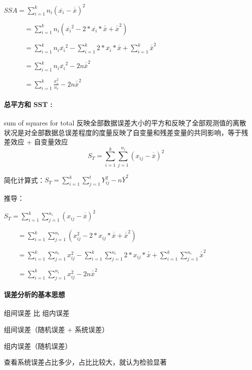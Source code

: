 \documentclass[UTF8,10pt]{book}
\begin{document}
    $ SSA = \sum_{i=1}^k n_i \left(\overline{x_i} - \overline{\overline{x}} \right)^2 $ 
    
    $\quad \quad \quad = \sum_{i=1}^k n_i \left( \overline{x_i}^2 -2*\overline{x_i} * \overline{\overline{x}} + \overline{\overline{x}}^2 \right) $ 
    
    $\quad \quad \quad = \sum_{i=1}^k n_i \overline{x_i}^2 - \sum_{i=1}^k 2*\overline{x_i} * \overline{\overline{x}} +\sum_{i=1}^k \overline{\overline{x}}^2$ 
    
    $\quad \quad \quad = \sum_{i=1}^k n_i \overline{x_i}^2 - 2n\overline{\overline{x}}^2$ 
    
    $\quad \quad \quad = \sum_{i=1}^k \frac{ x_i^2}{n_i} - 2n\overline{\overline{x}}^2 $

    \paragraph{总平方和 SST :} sum of squares for total	反映全部数据误差大小的平方和反映了全部观测值的离散状况是对全部数据总误差程度的度量反映了自变量和残差变量的共同影响，等于残差效应 + 自变量效应$$ S_T = \sum_{i=1}^k \sum_{j=1}^{n_i} \left(x_{ij} - \overline{\overline{x}} \right)^2 $$ 
    
    简化计算式：$ S_T = \sum_{i=1}^k \sum_{j=1}^{t} Y_{ij}^2 - n \overline{Y}^2 $ 
    
    推导： 
    
    $ S_T = \sum_{i=1}^k \sum_{j=1}^{n_i} \left(x_{ij} - \overline{\overline{x}} \right)^2 $ 
    
    $ \quad \quad = \sum_{i=1}^k \sum_{j=1}^{n_i} \left( x_{ij}^2 - 2*x_{ij}* \overline{\overline{x}} + \overline{\overline{x}}^2 \right)$ 
    
    $ \quad \quad = \sum_{i=1}^k \sum_{j=1}^{n_i} x_{ij}^2 -\sum_{i=1}^k \sum_{j=1}^{n_i} 2*x_{ij}* \overline{\overline{x}} + \sum_{i=1}^k \sum_{j=1}^{n_i} \overline{\overline{x}}^2 $ 
    
    $ \quad \quad = \sum_{i=1}^k \sum_{j=1}^{n_i} x_{ij}^2 - 2n\overline{\overline{x}}^2$

    \paragraph{误差分析的基本思想}	组间误差 比 组内误差 
    
    组间误差（随机误差 + 系统误差）
    
    组内误差（随机误差） 
    
    查看系统误差占比多少，占比比较大，就认为检验显著
\end{document}
